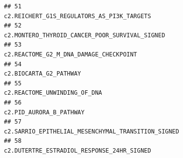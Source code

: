 \documentclass{article}\usepackage[]{graphicx}\usepackage[]{color}
\makeatletter
\newenvironment{kframe}{%
 \def\at@end@of@kframe{}%
 \ifinner\ifhmode%
  \def\at@end@of@kframe{\end{minipage}}%
  \begin{minipage}{\columnwidth}%
 \fi\fi%
 \def\FrameCommand##1{\hskip\@totalleftmargin \hskip-\fboxsep
 \colorbox{shadecolor}{##1}\hskip-\fboxsep
     \hskip-\linewidth \hskip-\@totalleftmargin \hskip\columnwidth}%
 \MakeFramed {\advance\hsize-\width
   \@totalleftmargin\z@ \linewidth\hsize
   \@setminipage}}%
 {\par\unskip\endMakeFramed%
 \at@end@of@kframe}
\newenvironment{knitrout}{}{} %
\makeatother
\begin{document}
\begin{knitrout}
\begin{kframe}
\begin{verbatim}
## 51                                                                                                                                                                                                                                                                                                             c2.REICHERT_G1S_REGULATORS_AS_PI3K_TARGETS
## 52                                                                                                                                                                                                                                                                                                         c2.MONTERO_THYROID_CANCER_POOR_SURVIVAL_SIGNED
## 53                                                                                                                                                                                                                                                                                                                 c2.REACTOME_G2_M_DNA_DAMAGE_CHECKPOINT
## 54                                                                                                                                                                                                                                                                                                                                 c2.BIOCARTA_G2_PATHWAY
## 55                                                                                                                                                                                                                                                                                                                           c2.REACTOME_UNWINDING_OF_DNA
## 56                                                                                                                                                                                                                                                                                                                                c2.PID_AURORA_B_PATHWAY
## 57                                                                                                                                                                                                                                                                                                     c2.SARRIO_EPITHELIAL_MESENCHYMAL_TRANSITION_SIGNED
## 58                                                                                                                                                                                                                                                                                                             c2.DUTERTRE_ESTRADIOL_RESPONSE_24HR_SIGNED

\end{verbatim}
\end{kframe}
\end{knitrout}
\end{document}
